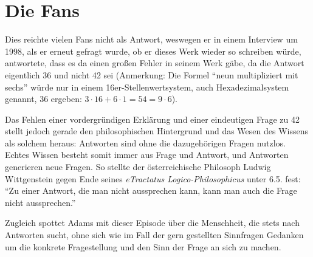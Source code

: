 \section{Die Fans}
Dies reichte vielen Fans nicht als Antwort, weswegen er in einem
Interview um 1998, als er erneut gefragt wurde, ob er dieses Werk
wieder so schreiben würde, antwortete, dass es da einen großen Fehler
in seinem Werk gäbe, da die Antwort eigentlich 36 und
nicht 42 sei (Anmerkung: Die Formel "`neun
multipliziert mit sechs"' würde nur in einem
16er-Stellenwertsystem, auch Hexadezimalsystem genannt, 36 ergeben:
$3\cdot 16 + 6\cdot 1 = 54 = 9\cdot 6$).

Das Fehlen einer vordergründigen Erklärung und einer eindeutigen Frage
zu 42 stellt jedoch gerade den philosophischen Hintergrund
und das Wesen des Wissens als solchem heraus: Antworten sind ohne die
dazugehörigen Fragen nutzlos. Echtes Wissen besteht somit immer aus
Frage und Antwort, und Antworten generieren neue Fragen. So stellte
der österreichische Philosoph Ludwig Wittgenstein gegen Ende seines
\emph{eTractatus Logico-Philosophicus} unter 6.5. fest: "`Zu
einer Antwort, die man nicht aussprechen kann, kann man auch die Frage
nicht aussprechen."'

Zugleich spottet Adams mit dieser Episode über die Menschheit, die
stets nach Antworten sucht, ohne sich wie im Fall der gern gestellten
Sinnfragen Gedanken um die konkrete Fragestellung und den Sinn der
Frage an sich zu machen.
